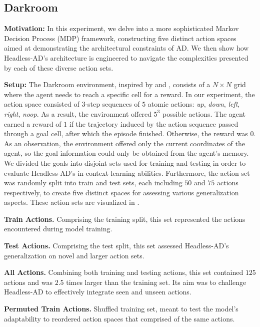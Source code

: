\subsection{Darkroom}
\label{sec:exp_gridworld}

\textbf{Motivation:} In this experiment, we delve into a more sophisticated Markov Decision Process (MDP) framework, constructing five distinct action spaces aimed at demonstrating the architectural constraints of AD. We then show how Headless-AD's architecture is engineered to navigate the complexities presented by each of these diverse action sets.

\textbf{Setup:} The Darkroom environment, inspired by \citet{chevalier2018minimalistic} and \citet{jain2020generalization}, consists of a $N \times N$ grid where the agent needs to reach a specific cell for a reward. In our experiment, the action space consisted of $3$-step sequences of $5$ atomic actions: \textit{up}, \textit{down}, \textit{left}, \textit{right}, \textit{noop}. As a result, the environment offered $5^3$ possible actions. The agent earned a reward of $1$ if the trajectory induced by the action sequence passed through a goal cell, after which the episode finished. Otherwise, the reward was $0$. As an observation, the environment offered only the current coordinates of the agent, so the goal information could only be obtained from the agent's memory. We divided the goals into disjoint sets used for training and testing in order to evaluate Headless-AD's in-context learning abilities. Furthermore, the action set was randomly split into train and test sets, each including $50$ and $75$ actions respectively, to create five distinct spaces for assessing various generalization aspects. These action sets are visualized in .

\textbf{Train Actions.} Comprising the training split, this set represented the actions encountered during model training.

\textbf{Test Actions.} Comprising the test split, this set assessed Headless-AD's generalization on novel and larger action sets.

\textbf{All Actions.} Combining both training and testing actions, this set contained $125$ actions and was $2.5$ times larger than the training set. Its aim was to challenge Headless-AD to effectively integrate seen and unseen actions.

\textbf{Permuted Train Actions.} Shuffled training set, meant to test the model's adaptability to reordered action spaces that comprised of the same actions.

